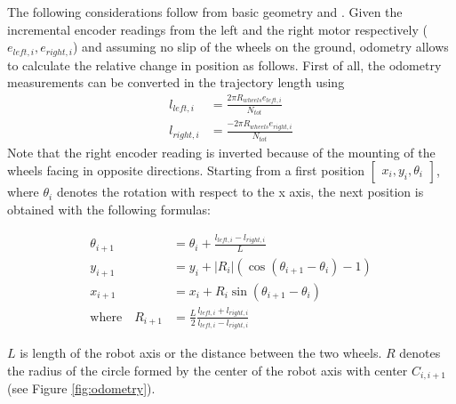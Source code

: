 The following considerations follow from basic geometry and \cite{Borenstein1996}.
Given the incremental encoder readings from the left and the right motor respectively ($e_{left,i},e_{right,i}$) and assuming no slip of the wheels on the ground, odometry allows to calculate the relative change in position as follows.
First of all, the odometry measurements can be converted in the trajectory length using
\begin{align}
    l_{left,i} &= \frac{2\pi R_{wheels} e_{left,i}}{N_{tot}} \\
    l_{right,i} &= \frac{-2\pi R_{wheels} e_{right,i}}{N_{tot}}
    \label{eq:encoders} 
\end{align}
Note that the right encoder reading is inverted because of the mounting of the wheels facing in opposite directions.
Starting from a first position $\begin{bmatrix} x_i,y_i,\theta_i \end{bmatrix}$, where $\theta_i$ denotes the rotation with respect to the x axis, the next position is obtained with the following formulas:

\begin{subequations}
    \begin{align}
        \theta_{i+1} &= \theta_i + \frac{l_{left,i}-l_{right,i}}{L} \\
        y_{i+1} &= y_i + |R_i| (\cos(\theta_{i+1}-\theta_{i})-1) \\
        x_{i+1} &= x_i + R_i \sin(\theta_{i+1}-\theta_i) \\
        \text{where} \quad R_{i+1} &= \frac{L}{2} \frac{l_{left,i}+l_{right,i}}{l_{left,i}-l_{right,i}} 
    \label{eq:positions}
\end{align}
\end{subequations}

$L$ is length of the robot axis or the distance between the two wheels. 
$R$ denotes the radius of the circle formed by the center of the robot axis with center $C_{i,i+1}$ (see Figure \ref{fig:odometry}).



